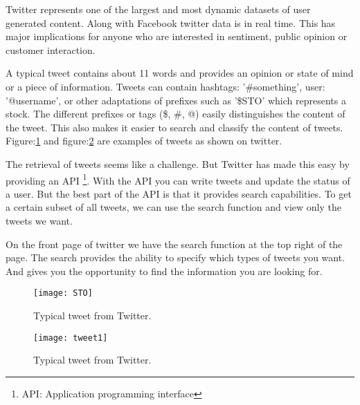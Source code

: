 Twitter represents one of the largest and most dynamic datasets of user
generated content. Along with Facebook twitter data is in real time. This has major
implications for anyone who are interested in sentiment, public opinion or
customer interaction. \cite[]{sperious11}

A typical tweet contains about 11 words and provides an opinion or state of
mind or a piece of information. Tweets can contain hashtags: '\#something', user:
'@username', or other adaptations of prefixes such as '\$STO' which represents a
stock. The different prefixes or tags (\$, \#, @) easily distinguishes the
content of the tweet. This also makes it easier to search and classify the
content of tweets. Figure:\ref{fig:sto} and figure:\ref{fig:tweet1} are
examples of tweets as shown on twitter.

The retrieval of tweets seems like a challenge. But Twitter has made this easy
by providing an API \footnote{API: Application programming interface}. With the
API you can write tweets and update the status of a user. But the best part of
the API is that it provides search capabilities. To get a certain subset of all
tweets, we can use the search function and view only the tweets we want. 

On the front page of twitter we have the search function at the top right of
the page. The search provides the ability to specify which types of tweets you
want. And gives you the opportunity to find the information you are looking for. 

\begin{figure}[htb]
    \centering
    \texttt{[image: STO]} 
    \caption{Typical tweet from Twitter.}
    \label{fig:sto}
\end{figure}


\begin{figure}[htb]
    \centering
    \texttt{[image: tweet1]} 
    \caption{Typical tweet from Twitter.}
    \label{fig:tweet1}
\end{figure}

%

